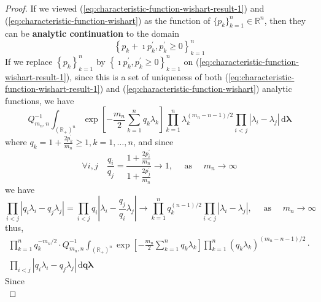 \begin{proof}
    If we viewed (\ref{eq:characteristic-function-wishart-result-1}) and (\ref{eq:characteristic-function-wishart}) as the function of $\{p_{k}\}_{k=1}^{n}\in\mathbb{R}^{n}$, then they can be \textbf{analytic continuation} to the domain
    \begin{equation*}
        \left\{p_{k}+\imath p_{k}^{\prime},p_{k}^{\prime}\geq 0\right\}_{k=1}^{n}
    \end{equation*}
    If we replace $\left\{p_{k}\right\}_{k=1}^{n}$ by $\left\{\imath p_{k}^{\prime},p_{k}^{\prime}\geq 0\right\}_{k=1}^{n}$ on (\ref{eq:characteristic-function-wishart-result-1}), since this is a set of uniqueness of both (\ref{eq:characteristic-function-wishart-result-1}) and (\ref{eq:characteristic-function-wishart}) analytic functions, we have
    \begin{equation*}
        Q_{m_{n},n}^{-1}\int_{\left(\mathbb{R}_{+}\right)^{n}}\exp\left[-\frac{m_{n}}{2}\sum_{k=1}^{n}q_{k}\lambda_{k}\right]\prod_{k=1}^{n}\lambda_{k}^{(m_{n}-n-1)/2}\prod_{i<j}\left|\lambda_{i}-\lambda_{j}\right|\,\mathrm{d}\boldsymbol{\lambda}
    \end{equation*}
    where $q_{k}=1+\frac{2p_{k}^{\prime}}{m_{n}}\geq 1,k=1,\ldots,n$, and since
    \begin{equation*}
        \forall i,j\quad\frac{q_{i}}{q_{j}}=\frac{1+\frac{2p_{i}^{\prime}}{m_{n}}}{1+\frac{2p_{j}^{\prime}}{m_{n}}}\rightarrow 1,\quad\text{ as }\quad m_{n}\rightarrow\infty
    \end{equation*}
    we have
    \begin{equation*}
        \prod_{i<j}\left|q_{i}\lambda_{i}-q_{j}\lambda_{j}\right|=\prod_{i<j}q_{i}\left|\lambda_{i}-\frac{q_{j}}{q_{i}}\lambda_{j}\right|\rightarrow\prod_{k=1}^{n}q_{k}^{(n-1)/2}\prod_{i<j}\left|\lambda_{i}-\lambda_{j}\right|,\quad\text{ as }\quad m_{n}\rightarrow\infty
    \end{equation*}
    thus,
    \begin{equation*}
        \begin{array}{c}
            \prod_{k=1}^{n}q_{k}^{-m_{n}/2}\cdot Q_{m_{n},n}^{-1}\int_{\left(\mathbb{R}_{+}\right)^{n}}\exp\left[-\frac{m_{n}}{2}\sum_{k=1}^{n}q_{k}\lambda_{k}\right]\prod_{k=1}^{n}\left(q_{k}\lambda_{k}\right)^{(m_{n}-n-1)/2}\cdot \\
            \prod_{i<j}\left|q_{i}\lambda_{i}-q_{j}\lambda_{j}\right|\,\mathrm{d}\mathbf{q}\boldsymbol{\lambda}
        \end{array}
    \end{equation*}
    Since
    \begin{equation*}

\end{equation*}
\end{proof}
